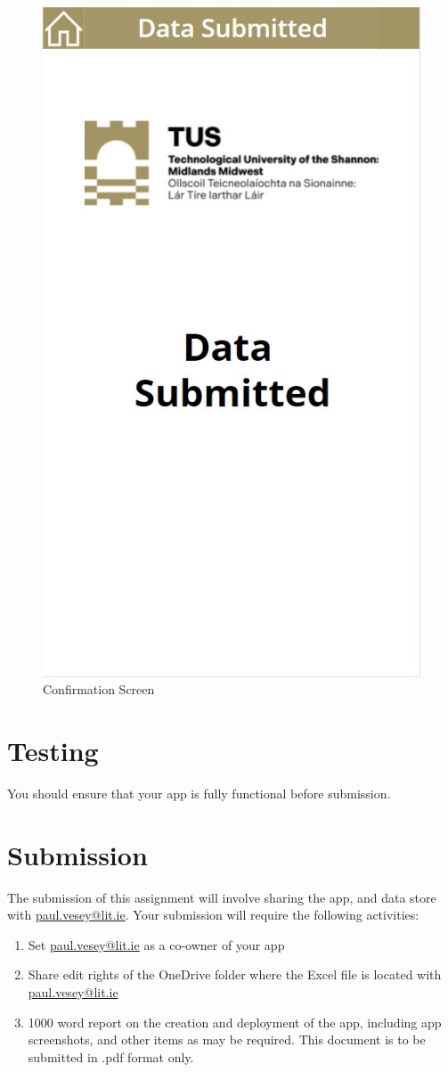 \begin{figure}
	\centering
	\includegraphics[width=0.7\linewidth]{./ConfirmationScreen.jpg}
	\caption{Confirmation Screen}
	\label{fig:ConfirmationScreen}
\end{figure}



\section*{Testing}
You should ensure that your app is fully functional before submission.


\section*{Submission}
The submission of this assignment will involve sharing the app, and data store with \href{email:paul.vesey@lit.ie}{paul.vesey@lit.ie}.  Your submission will require the following activities:
\begin{enumerate}
	\item Set \href{email:paul.vesey@lit.ie}{paul.vesey@lit.ie} as a co-owner of your app
	\item Share edit rights of the OneDrive folder where the Excel file is located with \href{email:paul.vesey@lit.ie}{paul.vesey@lit.ie}
	\item 1000 word report on the creation and deployment of the app, including app screenshots, and other items as may be required.  This document is to be submitted in .pdf format only.
\end{enumerate}



